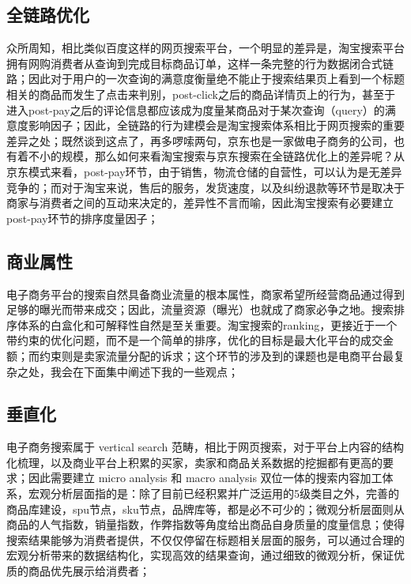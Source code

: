 \subsection{全链路优化}

众所周知，相比类似百度这样的网页搜索平台，一个明显的差异是，淘宝搜索平台拥有网购消费者从查询到完成目标商品订单，这样一条完整的行为数据闭合式链路；因此对于用户的一次查询的满意度衡量绝不能止于搜索结果页上看到一个标题相关的商品而发生了点击来判别，post-click之后的商品详情页上的行为，甚至于进入post-pay之后的评论信息都应该成为度量某商品对于某次查询（query）的满意度影响因子；因此，全链路的行为建模会是淘宝搜索体系相比于网页搜索的重要差异之处；既然谈到这点了，再多啰嗦两句，京东也是一家做电子商务的公司，也有着不小的规模，那么如何来看淘宝搜索与京东搜索在全链路优化上的差异呢？从京东模式来看，post-pay环节，由于销售，物流仓储的自营性，可以认为是无差异竞争的；而对于淘宝来说，售后的服务，发货速度，以及纠纷退款等环节是取决于商家与消费者之间的互动来决定的，差异性不言而喻，因此淘宝搜索有必要建立post-pay环节的排序度量因子；

\subsection{商业属性}

电子商务平台的搜索自然具备商业流量的根本属性，商家希望所经营商品通过得到足够的曝光而带来成交；因此，流量资源（曝光）也就成了商家必争之地。搜索排序体系的白盒化和可解释性自然是至关重要。淘宝搜索的ranking，更接近于一个带约束的优化问题，而不是一个简单的排序，优化的目标是最大化平台的成交金额；而约束则是卖家流量分配的诉求；这个环节的涉及到的课题也是电商平台最复杂之处，我会在下面集中阐述下我的一些观点；

\subsection{垂直化}
电子商务搜索属于 vertical search 范畴，相比于网页搜索，对于平台上内容的结构化梳理，以及商业平台上积累的买家，卖家和商品关系数据的挖掘都有更高的要求；因此需要建立 micro analysis 和 macro analysis 双位一体的搜索内容加工体系，宏观分析层面指的是：除了目前已经积累并广泛运用的5级类目之外，完善的商品库建设，spu节点，sku节点，品牌库等，都是必不可少的；微观分析层面则从商品的人气指数，销量指数，作弊指数等角度给出商品自身质量的度量信息；使得搜索结果能够为消费者提供，不仅仅停留在标题相关层面的服务，可以通过合理的宏观分析带来的数据结构化，实现高效的结果查询，通过细致的微观分析，保证优质的商品优先展示给消费者；


